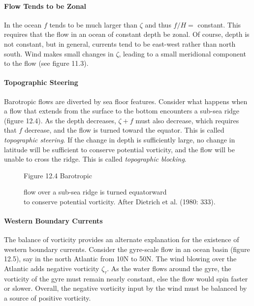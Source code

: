 \paragraph{Flow Tends to be Zonal} In the ocean $f$ tends to be much larger than
 $\zeta$ and thus $f/H = $ constant. This requires that the flow in an ocean of constant depth be
zonal. Of course, depth is not constant, but in general, currents tend to be east-west rather
than north south. Wind makes small changes in $\zeta$, leading to a small meridional
component to the flow (see figure 11.3). 

\paragraph{Topographic Steering} Barotropic flows are diverted by sea
floor features. Consider what happens when a flow that extends from the surface to
the bottom encounters a sub-sea ridge (figure 12.4). As the depth decreases,
$\zeta + f$ must also decrease, which requires that $f$ decrease, and the flow is
turned toward the equator. This is called \textit{topographic
steering}. If the change in depth is sufficiently
large, no change in latitude will be sufficient to conserve potential vorticity, and
the flow will be unable to cross the ridge. This is called \textit{topographic
blocking}.

\begin{figure}[h!]
\centering
\vspace{-1ex}
\footnotesize
Figure 12.4 Barotropic \rule{0pt}{3ex} flow over a sub-sea ridge is turned equatorward\\to conserve potential vorticity. After Dietrich et al. (1980: 333).

\label{fig:ridgevorticity}
\vspace{-3ex}
\end{figure}

\paragraph{Western Boundary Currents} The balance of vorticity provides an alternate explanation for the existence of western boundary currents. Consider the gyre-scale flow in an ocean basin (figure 12.5), say in the north Atlantic from 10\degrees N to 50\degrees N. The wind blowing over the Atlantic adds negative vorticity $\zeta_{\tau}$. As the water flows around the gyre, the vorticity of the gyre must remain nearly constant, else the flow would spin faster or slower. Overall, the negative vorticity input by the wind  must be balanced by a source of positive vorticity.

